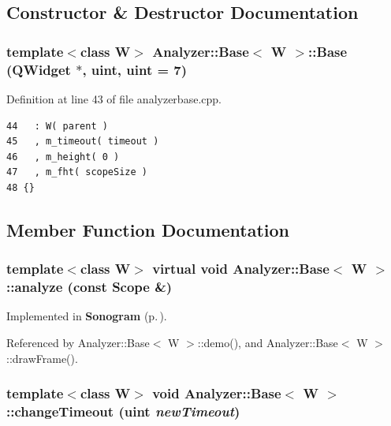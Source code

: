 \subsection{Constructor \& Destructor Documentation}
\subsubsection{\setlength{\rightskip}{0pt plus 5cm}template$<$class W$>$ {\bf Analyzer::Base}$<$ W $>$::{\bf Base} ({\bf QWidget} $\ast$, uint, uint = 7)\hspace{0.3cm}{\tt  [protected]}}\label{classAnalyzer_1_1Base_Analyzer_1_1Baseb0}




Definition at line 43 of file analyzerbase.cpp.



\footnotesize\begin{verbatim}44   : W( parent )
45   , m_timeout( timeout )
46   , m_height( 0 )
47   , m_fht( scopeSize )
48 {}
\end{verbatim}\normalsize 


\subsection{Member Function Documentation}
\subsubsection{\setlength{\rightskip}{0pt plus 5cm}template$<$class W$>$ virtual void {\bf Analyzer::Base}$<$ W $>$::analyze (const {\bf Scope} \&)\hspace{0.3cm}{\tt  [protected, pure virtual]}}\label{classAnalyzer_1_1Base_Analyzer_1_1Baseb3}




Implemented in {\bf Sonogram} {\rm (p.\,\pageref{classSonogram_Sonograma3})}.

Referenced by Analyzer::Base$<$ W $>$::demo(), and Analyzer::Base$<$ W $>$::draw\-Frame().
\subsubsection{\setlength{\rightskip}{0pt plus 5cm}template$<$class W$>$ void {\bf Analyzer::Base}$<$ W $>$::change\-Timeout (uint {\em new\-Timeout})\hspace{0.3cm}{\tt  [inline, protected]}}\label{classAnalyzer_1_1Base_Analyzer_1_1Baseb6}




